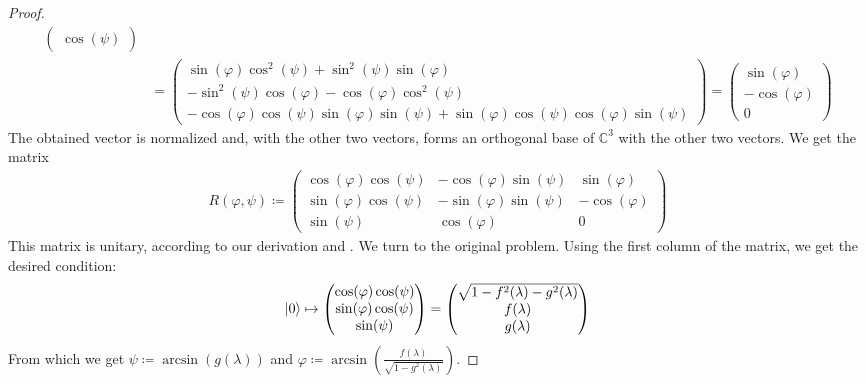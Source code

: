 \begin{proof}
\begin{align}
\begin{pmatrix}
            \cos(\psi)
        \end{pmatrix}\\
        &= \begin{pmatrix}
            \sin(\varphi)\cos^2(\psi)+\sin^2(\psi)\sin(\varphi)\\
            -\sin^2(\psi)\cos(\varphi)-\cos(\varphi)\cos^2(\psi)\\
            -\cos(\varphi)\cos(\psi)\sin(\varphi)\sin(\psi)+\sin(\varphi)\cos(\psi)\cos(\varphi)\sin(\psi)
        \end{pmatrix} = \begin{pmatrix}
            \sin(\varphi)\\
            -\cos(\varphi)\\
            0
        \end{pmatrix}
    \end{align}
    The obtained vector is normalized and, with the other two vectors, forms an orthogonal base of \(\mathbb{C}^3\) with the other two vectors. We get the matrix
    \begin{align}
        R(\varphi, \psi) \coloneqq \begin{pmatrix}
            \cos(\varphi)\cos(\psi) & -\cos(\varphi)\sin(\psi) & \sin(\varphi)\\
            \sin(\varphi)\cos(\psi) & -\sin(\varphi)\sin(\psi) & -\cos(\varphi)\\
            \sin(\psi)              & \cos(\varphi)            & 0
        \end{pmatrix}
    \end{align}
    This matrix is unitary, according to our derivation and . We turn to the original problem. Using the first column of the matrix, we get the desired condition:
    \begin{align}
        \ket{0} \mapsto \begin{pmatrix}
            \cos(\varphi)\cos(\psi)\\
            \sin(\varphi)\cos(\psi)\\
            \sin(\psi)
        \end{pmatrix} = \begin{pmatrix}
            \sqrt{1-f^2(\lambda)-g^2(\lambda)}\\
            f(\lambda)\\
            g(\lambda)
        \end{pmatrix}
    \end{align}
    From which we get \(\psi \coloneqq \arcsin(g(\lambda))\) and \(\varphi \coloneqq \arcsin\left(\frac{f(\lambda)}{\sqrt{1-g^2(\lambda)}}\right)\).


\end{proof}
